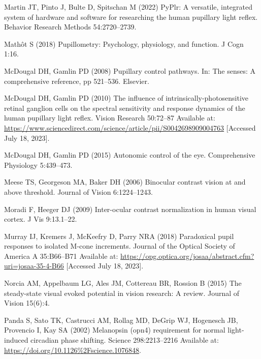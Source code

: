 \documentclass[
]{article}
\begin{document}
\leavevmode\hypertarget{ref-Martin2022}{}%
Martin JT, Pinto J, Bulte D, Spitschan M (2022) PyPlr: A versatile, integrated system of hardware and software for researching the human pupillary light reflex. Behavior Research Methods 54:2720--2739.

\leavevmode\hypertarget{ref-Mathot2018}{}%
Mathôt S (2018) Pupillometry: Psychology, physiology, and function. J Cogn 1:16.

\leavevmode\hypertarget{ref-McDougal2008}{}%
McDougal DH, Gamlin PD (2008) Pupillary control pathways. In: The senses: A comprehensive reference, pp 521--536. Elsevier.

\leavevmode\hypertarget{ref-McDougal2010}{}%
McDougal DH, Gamlin PD (2010) The influence of intrinsically-photosensitive retinal ganglion cells on the spectral sensitivity and response dynamics of the human pupillary light reflex. Vision Research 50:72--87 Available at: \url{https://www.sciencedirect.com/science/article/pii/S0042698909004763} {[}Accessed July 18, 2023{]}.

\leavevmode\hypertarget{ref-McDougal2015}{}%
McDougal DH, Gamlin PD (2015) Autonomic control of the eye. Comprehensive Physiology 5:439--473.

\leavevmode\hypertarget{ref-Meese2006}{}%
Meese TS, Georgeson MA, Baker DH (2006) Binocular contrast vision at and above threshold. Journal of Vision 6:1224--1243.

\leavevmode\hypertarget{ref-Moradi2009}{}%
Moradi F, Heeger DJ (2009) Inter-ocular contrast normalization in human visual cortex. J Vis 9:13.1--22.

\leavevmode\hypertarget{ref-Murray2018}{}%
Murray IJ, Kremers J, McKeefry D, Parry NRA (2018) Paradoxical pupil responses to isolated M-cone increments. Journal of the Optical Society of America A 35:B66--B71 Available at: \url{https://opg.optica.org/josaa/abstract.cfm?uri=josaa-35-4-B66} {[}Accessed July 18, 2023{]}.

\leavevmode\hypertarget{ref-Norcia2015}{}%
Norcia AM, Appelbaum LG, Ales JM, Cottereau BR, Rossion B (2015) The steady-state visual evoked potential in vision research: A review. Journal of Vision 15(6):4.

\leavevmode\hypertarget{ref-Panda2002}{}%
Panda S, Sato TK, Castrucci AM, Rollag MD, DeGrip WJ, Hogenesch JB, Provencio I, Kay SA (2002) Melanopsin (opn4) requirement for normal light-induced circadian phase shifting. Science 298:2213--2216 Available at: \url{https://doi.org/10.1126\%2Fscience.1076848}.
\end{document}
